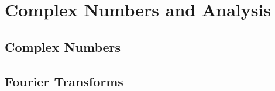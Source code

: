 


\hypertarget{ch:complex}{%
\chapter{Complex Numbers and Analysis}\label{ch:complex}}


\section{Complex Numbers}


\section{Fourier Transforms}